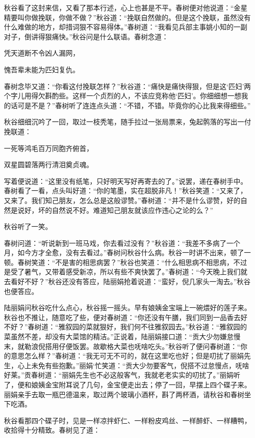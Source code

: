 \documentclass[12pt,UTF8]{ctexbook}
\begin{document}
{{{秋谷看了这封来信，又看了那本行述，心上也甚是不平。春树便对他说道：“金星精要叫你做挽联，你做不做？”秋谷道：“挽联自然做的。但是这个挽联，虽然没有什么难做的地方，却措词狠不容易得体。”春树道：“我看见兵部主事姚小知的一副对子，倒讲得狠痛快。”秋谷问是什么联语。春树念道：

凭天道断不令凶人漏网，

愧吾辈未能为匹妇复仇。

春树念毕又道：“你看这付挽联怎样？”秋谷道：“痛快是痛快得狠，但是这‘匹妇’两个字儿用得欠斟酌些。这样一个贞烈的人，不该应竞称他‘匹妇’。你细细想一想我的话可是不是？”春树听了连连点头道：“不错，不错。毕竟你的心比我来得细些。”

秋谷细细沉吟了一回，取过一枝秃笔，随手拉过一张局票来，兔起鹘落的写出一付挽联道：

一死等鸿毛百万同胞齐俯首，

双星圆碧落两行清泪奠贞魂。

写着便说道：“这里没有纸笔，只好明天写好再寄去的了。”说罢，递在春树手中。春树看了一看，点头叫好道：“你的笔墨，实在超脱非凡！”秋谷笑道：“又来了，又来了。我们知己朋友，怎么总是这般谬赞。”春树道：“并不是什么谬赞，好的自然是说好，坏的自然说不好。难道知己朋友就该应作违心之论的么？”

秋谷听了一笑。

春树问道：“听说新到一班马戏，你去看过没有？”秋谷道：“我差不多病了一个月，如今方才全愈，没有去看过。”春树问秋谷什么病。秋谷一时讲不出来，顿了一顿。春树笑道：“不是害的相思病罢？”秋谷也笑道：“什么相思病不相思病，不过是受了暑气，又带着感受新凉，所以有些不爽快罢了。”春树道：“今天晚上我们就去看好不好？”秋谷还没有答应，陆丽娟抢着说道：“蛮好，倪几家头一淘去。”秋谷也便答应。

陆丽娟问秋谷吃什么点心，秋谷摇一摇头。早有娘姨金宝端上一碗煨好的莲子来。秋谷也不推让，随意吃了些，便对春树道：“你还没有午膳，我们同到一品香去好不好？”春树道：“雅叙园的菜就狠好，我们何不往雅叙园去。”秋谷道：“雅叙园的菜虽然不差，却没有大菜馆的精洁。”正说着，陆丽娟接口道：“贡大少勿嫌怠慢末，就勒浪倪搭用仔便饭罢。故歇格大菜也呒啥吃头。”秋谷听了便问春树道：“你的意思怎么样？”春树道：“我无可无不可的，就在这里吃也好；但是叨扰了丽娟先生，心上未免有些抱歉。”丽娟‘忙笑道：“贡大少勿要客气，倪搭不过怠慢点，呒啥好莱。”贡春树道：“丽娟先生也不必这般客气，我就老老实实的叨扰了。”丽娟听了，便和娘姨金宝附耳说了几句，金宝便走出去；停了一回，早摆上四个碟子来。丽娟亲手去取一瓶巴德温来，取过两个玻璃小酒杯，斟了两杯酒，请秋谷和春树坐下吃酒。

秋谷看那四个碟子时，见是一样凉拌虾仁、一样粉皮鸡丝、一样醉虾、一样糟鸭，收拾得十分精致。春树见了道：

}}}
\end{document}

